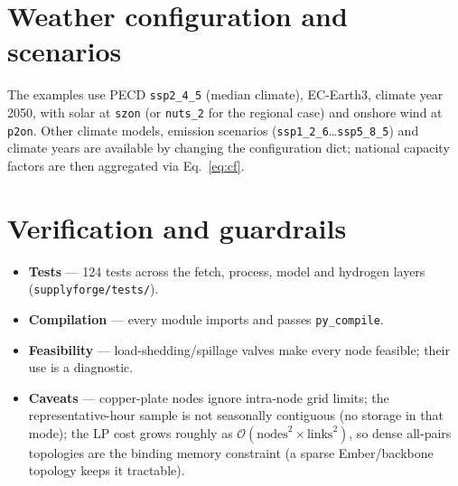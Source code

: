 \documentclass[11pt,a4paper]{article}
\begin{document}
\section{Weather configuration and scenarios}
The examples use PECD \texttt{ssp2\_4\_5} (median climate), EC-Earth3, climate year 2050, with solar at
\texttt{szon} (or \texttt{nuts\_2} for the regional case) and onshore wind at \texttt{p2on}. Other
climate models, emission scenarios (\texttt{ssp1\_2\_6}\dots\texttt{ssp5\_8\_5}) and climate years are
available by changing the configuration dict; national capacity factors are then aggregated via
Eq.~\eqref{eq:cf}.

\section{Verification and guardrails}
\begin{itemize}[nosep]
  \item \textbf{Tests} --- 124 tests across the fetch, process, model and hydrogen layers
        (\texttt{supplyforge/tests/}).
  \item \textbf{Compilation} --- every module imports and passes \texttt{py\_compile}.
  \item \textbf{Feasibility} --- load-shedding/spillage valves make every node feasible; their use is a
        diagnostic.
  \item \textbf{Caveats} --- copper-plate nodes ignore intra-node grid limits; the representative-hour
        sample is not seasonally contiguous (no storage in that mode); the LP cost grows roughly as
        $\mathcal{O}(\text{nodes}^2 \times \text{links}^2)$, so dense all-pairs topologies are the
        binding memory constraint (a sparse Ember/backbone topology keeps it tractable).
\end{itemize}

\end{document}
